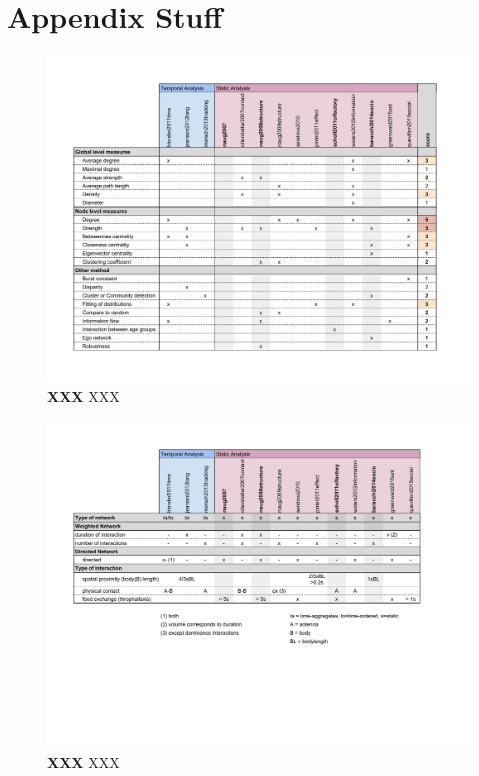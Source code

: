 \chapter{Appendix Stuff}
\label{ch:appendix}





\begin{figure}[htb]
	\centering
	\includegraphics[width=1.0\textwidth]{Figures/study-measures}
	\caption[XXX]{\textbf{XXX} XXX}
	\label{fig:study-measures}
\end{figure}

\begin{figure}[htb]
	\centering
	\includegraphics[width=1.0\textwidth]{Figures/study-nwtype}
	\caption[XXX]{\textbf{XXX} XXX}
	\label{fig:study-nwtype}
\end{figure}

